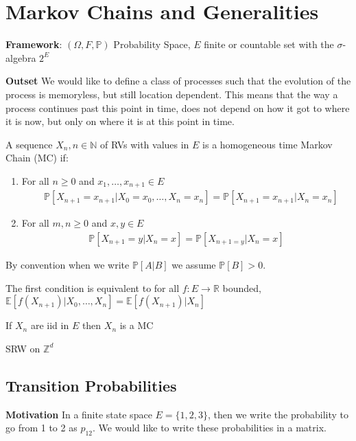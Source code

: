 \chapter{Markov Chains and Generalities}
\textbf{Framework}: $(\Omega, F, \mathbb{P})$ Probability Space, $E$ finite or countable set with the $\sigma$-algebra $2^E$

\noindent
\textbf{Outset} We would like to define a class of processes such that the evolution of the process is memoryless, but still location dependent. This means that the way a process continues past this point in time, does not depend on how it got to where it is now, but only on where it is at this point in time. 

\begin{defn}
	A sequence $X_n, n \in \mathbb{N}$ of RVs with values in $E$ is a homogeneous time Markov Chain (MC) if:
\begin{enumerate}
	\item  For all $n \geq 0$ and $x_1,\ldots,x_{n+1} \in E$
\begin{align}
	\quad \boxed{\mathbb{P} \left[ X_{n+1}=x_{n+1} | X_0=x_0,\ldots,X_n=x_n \right] = \mathbb{P} \left[ X_{n+1}=x_{n+1} | X_n = x_n \right]}
\end{align}
	\item For all $m,n \geq 0$ and $x,y \in E$
\begin{align}	
	\boxed{\mathbb{P} \left[ X_{n+1}=y | X_{n}=x \right] = \mathbb{P} \left[ X_{n+1=y}| X_n=x \right]} 
\end{align}
\end{enumerate}

\end{defn}


By convention when we write $\mathbb{P} \left[ A|B \right] $ we assume $\mathbb{P} \left[ B \right] >0$.

\begin{rmk}
The first condition is equivalent to for all $f:E\to \mathbb{R}$ bounded, $\mathbb{E} \left[ f(X_{n+1}) | X_0,\ldots,X_n \right] = \mathbb{E} \left[ f(X_{n+1}) | X_n \right] $
\end{rmk}

\begin{ex}
	If $X_n$ are iid in $E$ then $X_n$ is a MC
\end{ex}

\begin{ex}
	SRW on $\mathbb{Z}^d$
\end{ex}

\section{Transition Probabilities}
\textbf{Motivation} In a finite state space $E=\{1,2,3\}$, then we write the probability to go from 1 to 2 as $p_{12}$. We would like to write these probabilities in a matrix.

